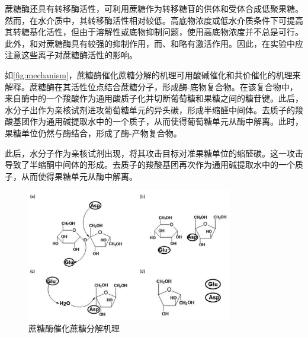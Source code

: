 蔗糖酶还具有转移酶活性，可利用蔗糖作为转移糖苷的供体和受体合成低聚果糖。然而，在水介质中，其转移酶活性相对较低。高底物浓度或低水介质条件下可提高其转糖基化活性，但由于溶解性或底物抑制问题，使用高底物浓度并不总是可行。此外，和对蔗糖酶具有较强的抑制作用，而、和略有激活作用。因此，在实验中应注意这些离子对蔗糖酶活性的影响。

如\autoref{fig:mechanism}，蔗糖酶催化蔗糖分解的机理可用酸碱催化和共价催化的机理来解释。蔗糖酶在其活性位点结合蔗糖分子，形成酶-底物复合物。在该复合物中，来自酶中的一个羧酸作为通用酸质子化并切断葡萄糖和果糖之间的糖苷键。此后，水分子出作为亲核试剂进攻葡萄糖单元的异头碳，形成半缩醛中间体。去质子的羧酸基团作为通用碱提取水中的一个质子，从而使得葡萄糖单元从酶中解离。此时，果糖单位仍然与酶结合，形成了酶-产物复合物。

此后，水分子作为亲核试剂出现，将其攻击目标对准果糖单位的缩醛碳。这一攻击导致了半缩酮中间体的形成。去质子的羧酸基团再次作为通用碱提取水中的一个质子，从而使得果糖单元从酶中解离。

\begin{figure}[H]
    \centering
    \includegraphics[width = 0.8\textwidth]{figure/principles/mechanism.png}
    \caption{蔗糖酶催化蔗糖分解机理\cite{pang2019structural}}
    \label{fig:mechanism}
\end{figure}